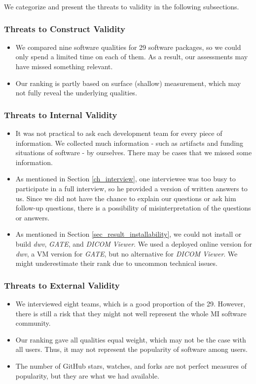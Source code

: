 \documentclass[preprint,12pt,authoryear]{elsarticle}
\begin{document}
\noindent We categorize and present the threats to validity in the following subsections.

\subsubsection{Threats to Construct Validity}
\begin{itemize}
\item We compared nine software qualities for 29 software packages, so we could
only spend a limited time on each of them. As a result, our assessments may have
missed something relevant.
\item Our ranking is partly based on surface (shallow) measurement, which may
not fully reveal the underlying qualities.
\end{itemize}

\subsubsection{Threats to Internal Validity}
\begin{itemize}
\item It was not practical to ask each development team for every piece of
information. We collected much information - such as artifacts and funding
situations of software - by ourselves. There may be cases that we missed some
information.
\item As mentioned in Section \ref{ch_interview}, one interviewee was too busy
to participate in a full interview, so he provided a version of written answers
to us. Since we did not have the chance to explain our questions or ask him
follow-up questions, there is a possibility of misinterpretation of the
questions or answers.
\item As mentioned in Section \ref{sec_result_installability}, we could not
install or build \textit{dwv}, \textit{GATE}, and \textit{DICOM Viewer}. We used
a deployed online version for \textit{dwv}, a VM version for \textit{GATE}, but
no alternative for \textit{DICOM Viewer}. We might underestimate their rank due
to uncommon technical issues.
\end{itemize}

\subsubsection{Threats to External Validity}
\begin{itemize}
\item We interviewed eight teams, which is a good proportion of the 29. However,
there is still a risk that they might not well represent the whole MI software
community.
\item Our ranking gave all qualities equal weight, which may not be the case
with all users. Thus, it may not represent the popularity of software among
users.
\item The number of GitHub stars, watches, and forks are not perfect measures of
popularity, but they are what we had available.
\end{itemize}
\end{document}

